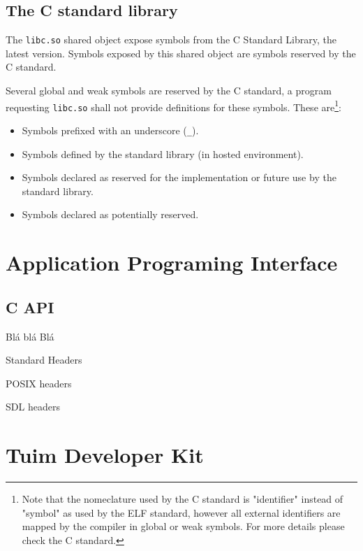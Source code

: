 \documentclass[
   article,                      %
   10pt,                         %
   openright,                    %
   oneside,                      %
   a4paper,                      %
   sumario = tradicional,        %
   english,                      %
   xcolor=table                  %
]{abntex2}
\begin{document}
\subsection{The C standard library}

The \texttt{libc.so} shared object
expose symbols from the C Standard Library, the latest version\cite{ISO9899}.
Symbols exposed by this shared object are symbols reserved by the C standard.

Several global and weak symbols
are reserved by the C standard,
a program requesting \texttt{libc.so}
shall not provide definitions for these symbols.
These are\footnote{%
   Note that the nomeclature used by the C standard is
   "identifier" instead of "symbol" as used by the ELF standard,
   however all external identifiers are mapped by the compiler in
   global or weak symbols.
   For more details please check the C standard\cite{ISO9899}.
}:

\begin{itemize}
   \item Symbols prefixed with an underscore (\texttt{\_}).
   \item Symbols defined by the standard library (in hosted environment).
   \item Symbols declared as reserved for the implementation
   or future use by the standard library.
   \item Symbols declared as potentially reserved.
\end{itemize}

\newpage
\section{Application Programing Interface}

\subsection{C API}

Blá blá Blá

Standard Headers

POSIX headers

SDL headers

\newpage
\section{Tuim Developer Kit}
\end{document}
